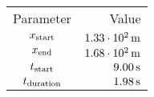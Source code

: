 \begin{tabular}{cr}
    \toprule
    Parameter & Value \\ \otoprule
    $x_{\textup{start}}$    & $\unit[1.33 \cdot 10^{2}]{m}$ \\
    $x_{\textup{end}}$      & $\unit[1.68 \cdot 10^{2}]{m}$ \\
    $t_{\textup{start}}$    & $\unit[9.00]{s}$ \\
    $t_{\textup{duration}}$ & $\unit[1.98]{s}$ \\
    \bottomrule
\end{tabular}
